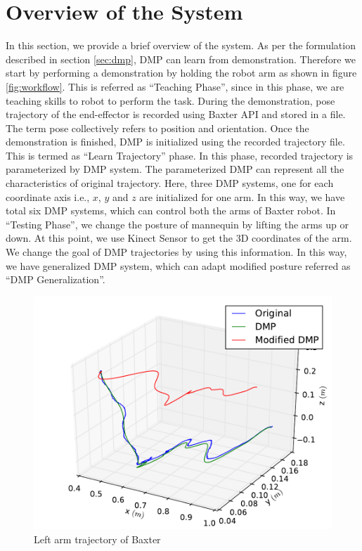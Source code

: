 \documentclass[sigconf]{acmart}
\begin{document}
\section{Overview of the System}
\label{sec:system_overview}
In this section, we provide a brief overview of the system. As per the formulation described in section \ref{sec:dmp}, DMP can learn from demonstration. Therefore we start by performing a demonstration by holding the robot arm as shown in figure \ref{fig:workflow}. This is referred as ``Teaching Phase'', since in this phase, we are teaching skills to robot to perform the task.  During the demonstration, pose trajectory of the end-effector is recorded using Baxter API and stored in a file. The term pose collectively refers to position and orientation. Once the demonstration is finished, DMP is initialized using the recorded trajectory file. This is termed as ``Learn Trajectory'' phase. In this phase, recorded trajectory is parameterized by DMP system. The parameterized DMP can represent all the characteristics of original trajectory. Here, three DMP systems, one for each coordinate axis i.e., $x$, $y$ and $z$ are initialized for one arm. In this way, we have total six DMP systems, which can control both the arms of Baxter robot. In ``Testing Phase'', we change the posture of mannequin by lifting the arms up or down. At this point, we use Kinect Sensor to get the 3D coordinates of the arm. We change the goal of DMP trajectories by using this information. In this way, we have generalized DMP system, which can adapt modified posture referred as ``DMP Generalization''.

\begin{figure}
	\includegraphics[width=\linewidth]{all_traj}
	\caption{Left arm trajectory of Baxter}
	\label{fig:trajectory}
\end{figure}
\end{document}
